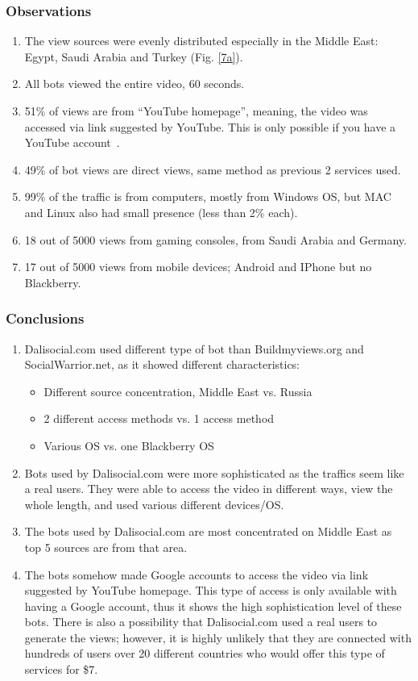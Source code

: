 \documentclass[conference]{IEEEtran}
\begin{document}
\subsubsection*{Observations}

\begin{enumerate}
  \item The view sources were evenly distributed especially in the Middle East: Egypt, Saudi Arabia and Turkey (Fig. \ref{7a}).
  \item All bots viewed the entire video, 60 seconds.
  \item 51\% of views are from “YouTube homepage”, meaning, the video was accessed via link suggested by YouTube.  This is only possible if you have a YouTube account~\cite{c21}.
  \item 49\% of bot views are direct views, same method as previous 2 services used.
  \item 99\% of the traffic is from computers, mostly from Windows OS, but MAC and Linux also had small presence (less than 2\% each).
  \item 18 out of 5000 views from gaming consoles, from Saudi Arabia and Germany.
  \item 17 out of 5000 views from mobile devices; Android and IPhone but no Blackberry.
\end{enumerate}

\subsubsection*{Conclusions}

\begin{enumerate}
  \item Dalisocial.com used different type of bot than Buildmyviews.org and SocialWarrior.net, as it showed different characteristics:
  \begin{itemize}
    \item Different source concentration, Middle East vs. Russia
    \item 2 different access methods vs. 1 access method
    \item Various OS vs. one Blackberry OS
  \end{itemize}
  \item Bots used by Dalisocial.com were more sophisticated as the traffics seem like a real users. They were able to access the video in different ways, view the whole length, and used various different devices/OS.
  \item The bots used by Dalisocial.com are most concentrated on Middle East as top 5 sources are from that area.
  \item The bots somehow made Google accounts to access the video via link suggested by YouTube homepage. This type of access is only available with having a Google account, thus it shows the high sophistication level of these bots. There is also a possibility that Dalisocial.com used a real users to generate the views; however, it is highly unlikely that they are connected with hundreds of users over 20 different countries who would offer this type of services for \$7.
\end{enumerate}
\end{document}

